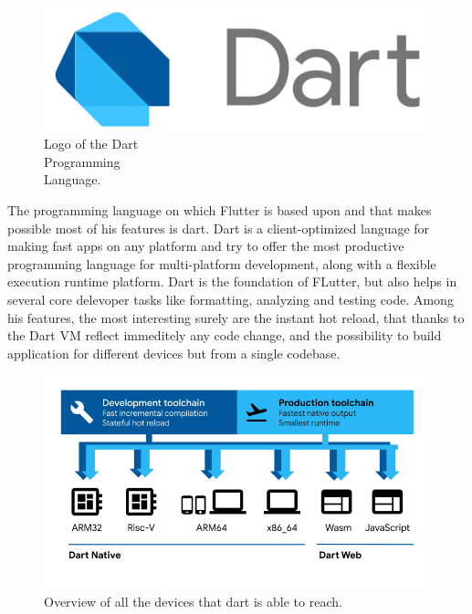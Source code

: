 \begin{figure} %
    \captionsetup{font=footnotesize}
    \centering
    \includegraphics[width=\linewidth]{images/dart.png}
    \caption{Logo of the Dart\\Programming\\Language.}
\end{figure}

The programming language on which Flutter is based upon and that makes possible most of his features is dart. Dart is a client-optimized language for making fast apps on any platform and try to offer the most productive programming language for multi-platform development, along with a flexible execution runtime platform. Dart is the foundation of FLutter, but also helps in several core delevoper tasks like formatting, analyzing and testing code. Among his features, the most interesting surely are the instant hot reload, that thanks to the Dart VM reflect immeditely any code change, and the possibility to build application for different devices but from a single codebase. 

\begin{figure}
    \includegraphics[width=1.0\linewidth]{./images/dart_platforms.png}
    \caption{Overview of all the devices that dart is able to reach.}
    \label{fig:dartPlatforms}
\end{figure}

